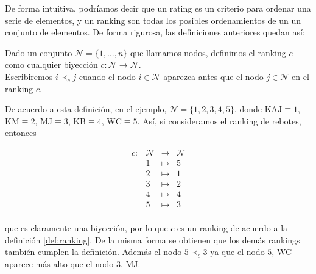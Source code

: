 De forma intuitiva, podríamos decir que un rating es un criterio para ordenar una serie de elementos, y un ranking son todas los posibles ordenamientos de un un conjunto de elementos. De forma rigurosa, las definiciones anteriores quedan así:

\begin{defi} \label{def:ranking}
Dado un conjunto $\mathcal{N} = \{1,\dots,n\}$ que llamamos nodos, definimos el ranking $c$ como cualquier biyección $c : \mathcal{N} \to \mathcal{N}$.\\
Escribiremos $i \prec_c j$ cuando el nodo $i \in \mathcal{N}$ aparezca antes que el nodo $j \in \mathcal{N}$ en el ranking $c$.
\end{defi}

De acuerdo a esta definición, en el ejemplo, $\mathcal{N} = \{1,2,3,4,5\}$, donde $\text{KAJ}\equiv 1$, $\text{KM}\equiv 2$, $\text{MJ}\equiv 3$, $\text{KB}\equiv 4$, $\text{WC}\equiv 5$. Así, si consideramos el ranking de rebotes, entonces

\[ \begin{array}{rlll}
c: & \mathcal{N} & \to & \mathcal{N}\\
& 1 & \mapsto & 5\\
& 2 & \mapsto & 1\\
& 3 & \mapsto & 2\\
& 4 & \mapsto & 4\\
& 5 & \mapsto & 3\\
\end{array} \] 

que es claramente una biyección, por lo que $c$ es un ranking de acuerdo a la definición \ref{def:ranking}. De la misma forma se obtienen que los demás rankings también cumplen la definición. Además el nodo $5 \prec_c 3$ ya que el nodo $5$, WC aparece más alto que el nodo $3$, MJ.

\begin{defi}

\end{defi}
